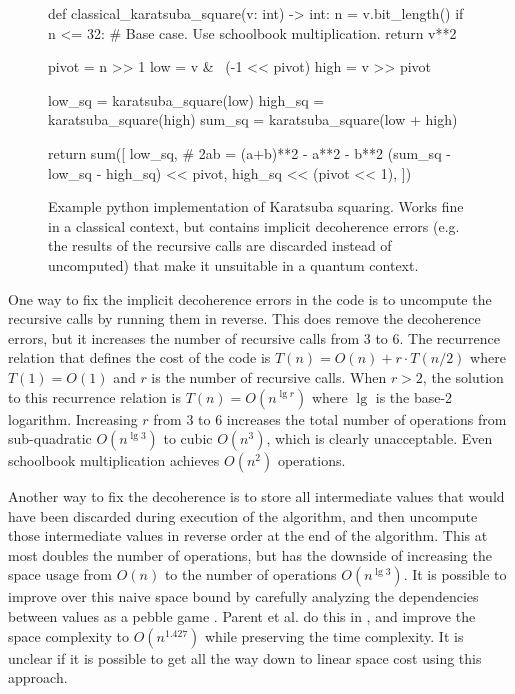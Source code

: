 \documentclass[onecolumn]{quantumarticle}
\begin{document}
\begin{figure}
\begin{python}
def classical_karatsuba_square(v: int) -> int:
    n = v.bit_length()
    if n <= 32:
        # Base case. Use schoolbook multiplication.
        return v**2

    pivot = n >> 1
    low = v & ~(-1 << pivot)
    high = v >> pivot

    low_sq = karatsuba_square(low)
    high_sq = karatsuba_square(high)
    sum_sq = karatsuba_square(low + high)

    return sum([
        low_sq,
        # 2ab = (a+b)**2 - a**2 - b**2
        (sum_sq - low_sq - high_sq) << pivot,
        high_sq << (pivot << 1),
    ])
\end{python}
\caption{
\label{fig:classical_code}
   Example python implementation of Karatsuba squaring.
   Works fine in a classical context, but contains implicit decoherence errors (e.g. the results of the recursive calls are discarded instead of uncomputed) that make it unsuitable in a quantum context.
}
\end{figure}

One way to fix the implicit decoherence errors in the code is to uncompute the recursive calls by running them in reverse.
This does remove the decoherence errors, but it increases the number of recursive calls from 3 to 6.
The recurrence relation that defines the cost of the code is $T(n) = O(n) + r \cdot T(n/2)$ where $T(1) = O(1)$ and $r$ is the number of recursive calls.
When $r>2$, the solution to this recurrence relation is $T(n) = O(n^{\lg r})$ where $\lg$ is the base-2 logarithm.
Increasing $r$ from 3 to 6 increases the total number of operations from sub-quadratic $O(n^{\lg 3})$ to cubic $O(n^3)$, which is clearly unacceptable.
Even schoolbook multiplication achieves $O(n^2)$ operations.

Another way to fix the decoherence is to store all intermediate values that would have been discarded during execution of the algorithm, and then uncompute those intermediate values in reverse order at the end of the algorithm.
This at most doubles the number of operations, but has the downside of increasing the space usage from $O(n)$ to the number of operations $O(n^{\lg 3})$.
It is possible to improve over this naive space bound by carefully analyzing the dependencies between values as a pebble game \cite{bennett1989pebble}.
Parent et al. do this in \cite{parent2017karatsuba}, and improve the space complexity to $O(n^{1.427})$ while preserving the time complexity.
It is unclear if it is possible to get all the way down to linear space cost using this approach.
\end{document}
